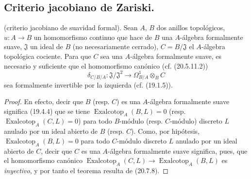 \subsection{Criterio jacobiano de Zariski.}
\label{subsection:0.22.6-fr}

\begin{theorem}[22.6.1]
\label{0.22.6.1-fr}
\textnormal{(criterio jacobiano de suavidad formal).}
Sean $A$, $B$ dos anillos topológicos,
$u:A\longrightarrow B$ un homomorfismo continuo que hace de $B$ una
$A$-álgebra \textup{formalmente suave}, $\mathfrak J$ un ideal de $B$ (no
necesariamente cerrado), $C=B/\mathfrak J$ el $A$-álgebra topológica cociente.
Para que $C$ sea una $A$-álgebra formalmente suave, es necesario y suficiente que
el homomorfismo canónico \textup{(cf. (20.5.11.2))}
\begin{equation}
\label{0.22.6.1.1-fr}
  \delta_{C/B/A}:\mathfrak J/\mathfrak J^2
  \longrightarrow\Omega^1_{B/A}\otimes_BC
  \tag{22.6.1.1}
\end{equation}
sea formalmente invertible por la izquierda \textup{(cf. (19.1.5))}.
\end{theorem}

\begin{proof}
En efecto, decir que $B$ (resp. $C$) es una $A$-álgebra formalmente suave
significa (19.4.4) que se tiene
$\operatorname{Exalcotop}_A(B,L)=0$ (resp.
$\operatorname{Exalcotop}_A(C,L)=0$) para todo $B$-módulo (resp. $C$-módulo)
discreto $L$ anulado por un ideal abierto de $B$ (resp. $C$). Como, por hipótesis,
$\operatorname{Exalcotop}_A(B,L)=0$ para todo $C$-módulo discreto $L$ anulado
por un ideal abierto de $C$, decir que $C$ es una $A$-álgebra formalmente suave
significa, pues, que el homomorfismo canónico
$\operatorname{Exalcotop}_A(C,L)\longrightarrow
\operatorname{Exalcotop}_A(B,L)$ es \emph{inyectivo}, y por tanto el teorema resulta de
(20.7.8).
\end{proof}

